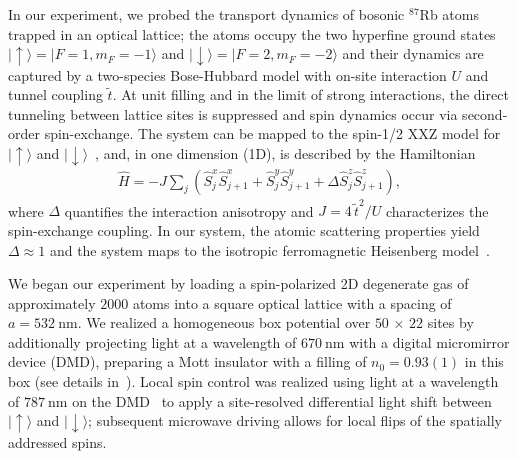 \documentclass[
 reprint,
 superscriptaddress,
 amsmath,amssymb,
 aps,
 pra,
]{revtex4-2}
\newcommand{\ket}[1]{\ensuremath{\lvert #1 \rangle}\xspace}%
\begin{document}


In our experiment, we probed the transport dynamics of bosonic $^{87}$Rb atoms trapped in an optical lattice; the atoms occupy the two hyperfine ground states $\ket{\uparrow} = \ket{F=1, m_F=-1}$ and $\ket{\downarrow} = \ket{F=2, m_F=-2}$ and their dynamics are captured by a two-species Bose-Hubbard model with on-site interaction $U$ and tunnel coupling $\tilde{t}$.
%
At unit filling and in the limit of strong interactions, the direct tunneling between lattice sites is suppressed and spin dynamics occur via second-order spin-exchange.
%
The system can be mapped to the spin-1/2 XXZ model for $\ket{\uparrow}$ and $\ket{\downarrow}$~\cite{Duan2003,Kuklov2003}, and, in one dimension (1D), is described by the Hamiltonian
\begin{align}
    \hat{H} = -J \sum_{j}\left( \hat{S}^x_j\hat{S}^x_{j+1}+\hat{S}^y_j\hat{S}^y_{j+1} + \Delta \hat{S}^z_j \hat{S}^z_{j+1}\right),
    \label{eq:XXZ}
\end{align}
where $\Delta$ quantifies the interaction anisotropy and $J = 4 \, \tilde{t}^2 / U$ characterizes the spin-exchange coupling.
%
In our system, the atomic scattering properties yield $\Delta \approx 1$ and the system maps to the isotropic ferromagnetic Heisenberg model~\cite{SI}.


We began our experiment by loading a spin-polarized 2D degenerate gas of approximately $2000$ atoms into a square optical lattice with a spacing of $a = \SI{532}{\nano\metre}$.
%
We realized a homogeneous box potential over $50\,\times\,22$ sites by additionally projecting light at a wavelength of $\SI{670}{\nano\metre}$ with a digital micromirror device (DMD), preparing a Mott insulator with a filling of $n_0 = 0.93(1)$ in this box (see details in~\cite{SI}).
%
Local spin control was realized using light at a wavelength of $\SI{787}{\nano\metre}$ on the DMD~\cite{Fukuhara2013} to apply a site-resolved differential light shift between $\ket{\uparrow}$ and $\ket{\downarrow}$; subsequent microwave driving allows for local flips of the spatially addressed spins.
\end{document}
